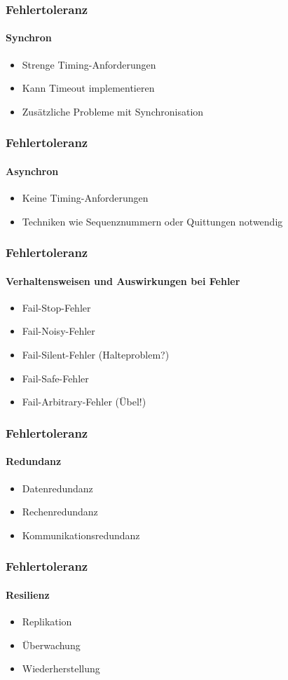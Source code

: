\begin{frame}
  \frametitle{Fehlertoleranz}
  \framesubtitle{Synchron}
 \begin{itemize}
    \item Strenge Timing-Anforderungen
    \item Kann Timeout implementieren
    \item Zusätzliche Probleme mit Synchronisation
  \end{itemize}    
\end{frame}

\begin{frame}
  \frametitle{Fehlertoleranz}
  \framesubtitle{Asynchron}
 \begin{itemize}
    \item Keine Timing-Anforderungen
    \item Techniken wie Sequenznummern oder Quittungen notwendig
  \end{itemize}    
\end{frame}

\begin{frame}
  \frametitle{Fehlertoleranz}
  \framesubtitle{Verhaltensweisen und Auswirkungen bei Fehler}
 \begin{itemize}
    \item Fail-Stop-Fehler
    \item Fail-Noisy-Fehler
    \item Fail-Silent-Fehler (Halteproblem?)
    \item Fail-Safe-Fehler
    \item Fail-Arbitrary-Fehler (Übel!)
  \end{itemize}    
\end{frame}

\begin{frame}
  \frametitle{Fehlertoleranz}
  \framesubtitle{Redundanz}
 \begin{itemize}
    \item Datenredundanz
    \item Rechenredundanz
    \item Kommunikationsredundanz
  \end{itemize}    
\end{frame}

\begin{frame}
  \frametitle{Fehlertoleranz}
  \framesubtitle{Resilienz}
 \begin{itemize}
    \item Replikation
    \item Überwachung
    \item Wiederherstellung
  \end{itemize}    
\end{frame}

